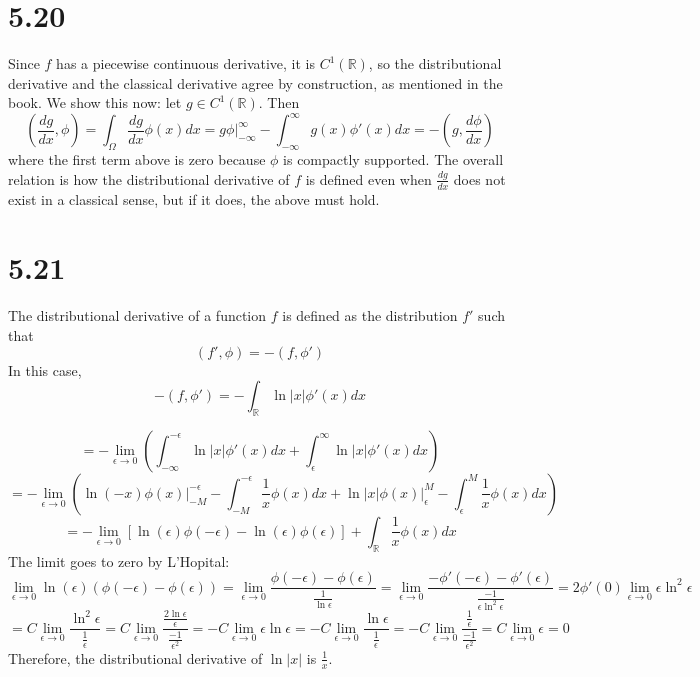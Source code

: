 \documentclass{article}
\begin{document}
\section*{5.20}
Since $f$ has a piecewise continuous derivative, it is $C^1(\mathbb{R})$, so the distributional derivative and the classical derivative agree by construction, as mentioned in the book. We show this now: let $g\in C^1(\mathbb{R})$. Then
\[\left( \frac{dg}{dx}, \phi \right)=\int_\Omega \frac{d g}{d x} \phi(x)dx=g\phi\bigg|_{-\infty}^\infty-\int_{-\infty}^\infty g(x)\phi'(x)dx =-\left( g, \frac{d\phi}{dx} \right)\]
where the first term above is zero because $\phi$ is compactly supported. The overall relation is how the distributional derivative of $f$ is defined even when $\frac{dg}{dx}$ does not exist in a classical sense, but if it does, the above must hold.

\section*{5.21}
The distributional derivative of a function $f$ is defined as the distribution $f'$ such that
\[(f',\phi)=-(f, \phi')\]
In this case,
\[-(f, \phi')=-\int_\mathbb{R}\ln|x|\phi'(x)dx\]

\[=-\lim_{\epsilon\to 0}\left( \int_{-\infty}^{-\epsilon}\ln|x|\phi'(x)dx+\int_\epsilon^\infty\ln|x|\phi'(x)dx\right)\]
\[=-\lim_{\epsilon\to 0}\left( \ln(-x)\phi(x)\bigg|_{-M}^{-\epsilon}-\int_{-M}^{-\epsilon}\frac{1}{x}\phi(x)dx+\ln|x|\phi(x)\bigg|_\epsilon^M-\int_{\epsilon}^M\frac{1}{x}\phi(x)dx \right)\]
\[=-\lim_{\epsilon\to 0}\left[  \ln(\epsilon)\phi(-\epsilon)-\ln(\epsilon)\phi(\epsilon) \right]+\int_\mathbb{R}\frac{1}{x}\phi(x)dx\]
The limit goes to zero by L'Hopital:
\[\lim_{\epsilon\to 0}\ln(\epsilon)\left( \phi(-\epsilon)-\phi(\epsilon) \right)=\lim_{\epsilon\to 0}\frac{\phi(-\epsilon)-\phi(\epsilon)}{\frac{1}{\ln\epsilon}}=\lim_{\epsilon\to 0}\frac{-\phi'(-\epsilon)-\phi'(\epsilon)}{\frac{-1}{\epsilon\ln^2\epsilon}}=2\phi'(0)\lim_{\epsilon\to 0}\epsilon\ln^2\epsilon\]
\[=C\lim_{\epsilon\to 0} \frac{\ln^2\epsilon}{\frac{1}{\epsilon}}=C\lim_{\epsilon\to 0}\frac{\frac{2\ln\epsilon}{\epsilon}}{\frac{-1}{\epsilon^2}}=-C\lim_{\epsilon\to 0}\epsilon\ln\epsilon=-C\lim_{\epsilon\to 0}\frac{\ln\epsilon}{\frac{1}{\epsilon}}=-C\lim_{\epsilon\to 0}\frac{\frac{1}{\epsilon}}{\frac{-1}{\epsilon^2}}=C\lim_{\epsilon\to 0}\epsilon=0\]
Therefore, the distributional derivative of $\ln|x|$ is $\frac{1}{x}$.
\end{document}
